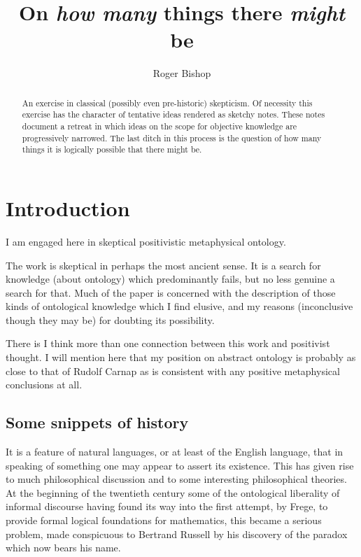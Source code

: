 \documentclass{rbjk}
\begin{document}
                                                                                   
\begin{article}
\begin{opening}  
\title{On {\it how many} things there {\it might} be}
\author{Roger Bishop }

\begin{abstract}
An exercise in classical (possibly even pre-historic) skepticism.
Of necessity this exercise has the character of tentative ideas rendered as sketchy notes.
These notes document a retreat in which ideas on the scope for objective knowledge are progressively narrowed.
The last ditch in this process is the question of how many things it is logically possible that there might be.
\end{abstract}
\end{opening}

{\it \tableofcontents}

\section{Introduction}

I am engaged here in skeptical positivistic metaphysical ontology.

The work is skeptical in perhaps the most ancient sense.
It is a search for knowledge (about ontology) which predominantly fails, but no less genuine a search for that.
Much of the paper is concerned with the description of those kinds of ontological knowledge which I find elusive, and my reasons (inconclusive though they may be) for doubting its possibility.

There is I think more than one connection between this work and positivist thought.
I will mention here that my position on abstract ontology is probably as close to that of Rudolf Carnap as is consistent with any positive metaphysical conclusions at all.

\subsection{Some snippets of history}

It is a feature of natural languages, or at least of the English language, that in speaking of something one may appear to assert its existence.
This has given rise to much philosophical discussion and to some interesting philosophical theories.
At the beginning of the twentieth century some of the ontological liberality of informal discourse having found its way into the first attempt, by Frege, to provide formal logical foundations for mathematics, this became a serious problem, made conspicuous to Bertrand Russell by his discovery of the paradox which now bears his name.


\end{article}
\end{document}

